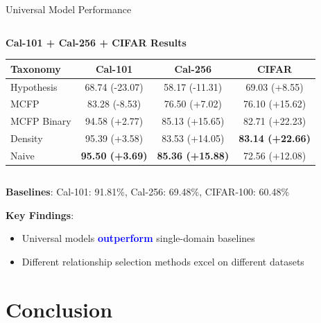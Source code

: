 \documentclass[aspectratio=169]{beamer}
\begin{document}
\begin{frame}{Universal Model Performance}
\begin{columns}[T]
        \begin{column}{0.48\textwidth}
            \textbf{Cal-101 + Cal-256 + CIFAR Results}
            \begin{table}[h]
                \centering
                \tiny
                \begin{tabular}{lccc}
                    \toprule
                    \textbf{Taxonomy} & \textbf{Cal-101}       & \textbf{Cal-256}        & \textbf{CIFAR}          \\
                    \midrule
                    Hypothesis        & 68.74 (-23.07)         & 58.17 (-11.31)          & 69.03 (+8.55)           \\
                    MCFP              & 83.28 (-8.53)          & 76.50 (+7.02)           & 76.10 (+15.62)          \\
                    MCFP Binary       & 94.58 (+2.77)          & 85.13 (+15.65)          & 82.71 (+22.23)          \\
                    Density           & 95.39 (+3.58)          & 83.53 (+14.05)          & \textbf{83.14 (+22.66)} \\
                    Naive             & \textbf{95.50 (+3.69)} & \textbf{85.36 (+15.88)} & 72.56 (+12.08)          \\
                    \bottomrule
                \end{tabular}
            \end{table}
        \end{column}
    \end{columns}

    \vspace{0.5em}

    \textbf{Baselines}: Cal-101: 91.81\%, Cal-256: 69.48\%, CIFAR-100: 60.48\%

    \textbf{Key Findings}:
    \begin{itemize}
        \item Universal models \textcolor{blue}{\textbf{outperform}} single-domain baselines
        \item Different relationship selection methods excel on different datasets
    \end{itemize}
\end{frame}

\section{Conclusion}
\end{document}
